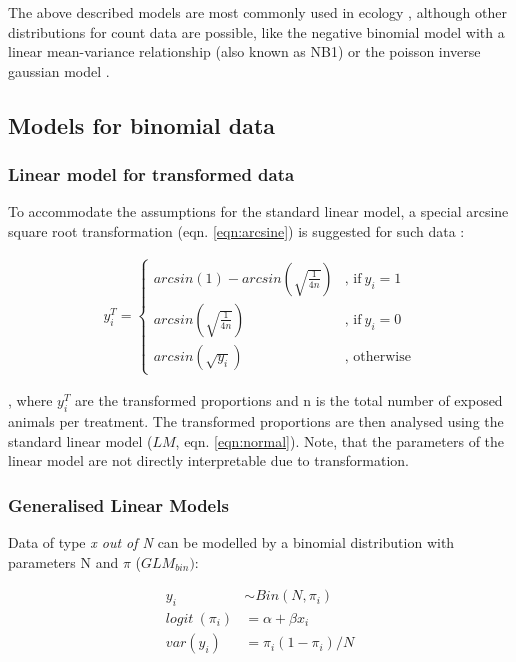 \documentclass[twocolumn, natbib]{svjour3}
\begin{document}
The above described models are most commonly used in ecology \citep{ver_hoef_quasi-poisson_2007}, although other distributions for count data are possible, like the negative binomial model with a linear mean-variance relationship (also known as NB1) or the poisson inverse gaussian model \citep{hilbe_modeling_2014}.


\subsection{Models for binomial data}
\subsubsection{Linear model for transformed data}
To accommodate the assumptions for the standard linear model, a special arcsine square root transformation (eqn. \ref{eqn:arcsine}) is suggested for such  data \citep{epa_methods_2002,newman_quantitative_2012}:

\begin{align}
  y_i^T = 
  \begin{cases}  
    arcsin(1) - arcsin(\sqrt{\frac{1}{4n}}) & \text{, if}\ y_i = 1 \\
    arcsin(\sqrt{\frac{1}{4n}}) & \text{, if}\ y_i = 0  \\
    arcsin(\sqrt{y_i}) & \text{, otherwise}
  \end{cases} \label{eqn:arcsine}
\end{align}

, where $y_i^T$ are the transformed proportions and n is the total number of exposed animals per treatment.
The transformed proportions are then analysed using the standard linear model ($LM$, eqn. \ref{eqn:normal}).
Note, that the parameters of the linear model are not directly interpretable due to transformation.


\subsubsection{Generalised Linear Models}
Data of type \emph{x out of N} can be modelled by a binomial distribution with parameters N and $\pi$ ($GLM_{bin})$:

\begin{align}
  y_i &\sim Bin(N, \pi_i) \nonumber \\
  logit~(\pi_i) &= \alpha + \beta x_i \label{eqn:bin} \\
  var(y_i) &=  \pi_i (1 - \pi_i) / N \nonumber
\end{align}
\end{document}
